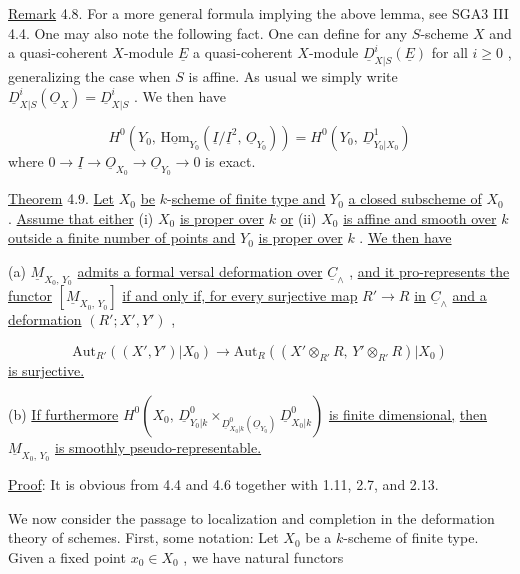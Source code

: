 \underline{Remark} 4.8.  For a more general formula implying the above lemma, see SGA3 III 4.4. One may also note the following fact. One can define for any $S$-scheme $X$ and a quasi-coherent $X$-module $\underline{E}$ a quasi-coherent $X$-module $\underline{D}^i_{X|S}(\underline{E})$ for all $i \geq 0$ , generalizing the case when $S$ is affine. As usual we simply write $\underline{D}^i_{X|S}(\underline{O}_X) = \underline{D}^i_{X|S}$ . We then have

\begin{equation*}
H^0(Y_0,\, \underline{\mathrm{Hom}}_{Y_0}(\underline{I}/\underline{I}^2,\, \underline{O}_{Y_0})) = H^0(Y_0,\, \underline{D}^1_{Y_0|X_0})
\end{equation*}
where $0 \to \underline{I} \to \underline{O}_{X_0} \to \underline{O}_{Y_0} \to 0$ is exact.

\underline{Theorem} 4.9.  \underline{Let} $X_0$ \underline{be} $k$-\underline{scheme of finite type and} $Y_0$ \underline{a closed subscheme of} $X_0$ . \underline{Assume that either} (i) $X_0$ \underline{is proper over} $k$ \underline{or} (ii) $X_0$ \underline{is affine and smooth over} $k$ \underline{outside a finite number of points and} $Y_0$ \underline{is proper over} $k$ . \underline{We then have}

(a) $\underline{M}_{X_0,\,Y_0}$ \underline{admits a formal versal deformation over} $\underline{C}_\wedge$ , \underline{and it pro-represents the functor} $[\underline{M}_{X_0,\,Y_0}]$ \underline{if and only if, for every surjective map} $R' \to R$ \underline{in} $\underline{C}_\wedge$ \underline{and a deformation} $(R'; X', Y')$ ,

\begin{equation*}
\mathrm{Aut}_{R'}((X', Y')|X_0) \to \mathrm{Aut}_R((X' \otimes_{R'} R,\, Y' \otimes_{R'} R)|X_0)
\end{equation*}
\underline{is surjective.}

(b) \underline{If furthermore} $H^0(X_0,\, \underline{D}^0_{Y_0|k} \times_{\underline{D}^0_{X_0|k}(\underline{O}_{Y_0})} \underline{D}^0_{X_0|k})$ \underline{is finite dimensional,} \underline{then} $\underline{M}_{X_0,\,Y_0}$ \underline{is smoothly pseudo-representable.}

\underline{Proof}: It is obvious from 4.4 and 4.6 together with 1.11, 2.7, and 2.13.

We now consider the passage to localization and completion in the deformation theory     of schemes. First, some notation: Let $X_0$ be a $k$-scheme of finite type. Given a fixed point $x_0 \in X_0$ , we have natural functors


